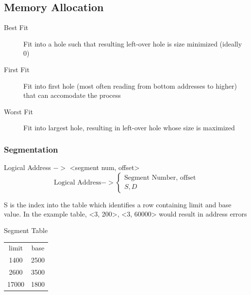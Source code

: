 \documentclass[a4paper]{article}
\begin{document}
\begin{multicols*}{2}
    \subsection*{Memory Allocation}
    \begin{description}
        \item[Best Fit] Fit into a hole such that resulting left-over hole is
            size minimized (ideally 0)
        \item[First Fit] Fit into first hole (most often reading from bottom
            addresses to higher) that can accomodate the process
        \item[Worst Fit] Fit into largest hole, resulting in left-over hole
            whose size is maximized
    \end{description}

    \begin{flushright}
        \vspace*{-2em}
        \subsubsection*{Segmentation}
    \end{flushright}
    Logical Address \(->\) <segment num, offset>
    \begin{equation*}
        \text{Logical Address} -> \begin{cases}
            \text{Segment Number, offset} \\
            S, D
        \end{cases}
    \end{equation*}

    \setlength{\columnsep}{-3em}

    \vspace*{-2em}

    \begin{multicols*}{2}
        S is the index into the table which identifies a row containing limit and base value.
        In the example table, <3, 200>, <3, 60000> would result in address errors
        \columnbreak
        \begin{center}
            Segment Table \\
            \begin{tabular}{c|c}
                limit & base \\
                1400  & 2500 \\
                2600  & 3500 \\
                17000 & 1800
            \end{tabular}
        \end{center}
    \end{multicols*}


\end{multicols*}
\end{document}
